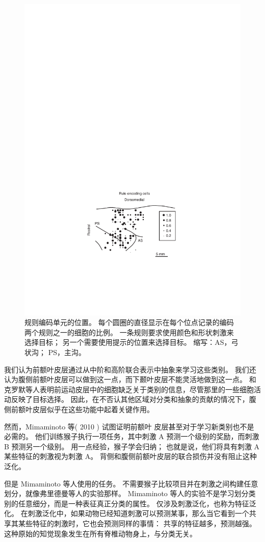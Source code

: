 \begin{figure}
	\centering
	\includegraphics[width=0.6\linewidth]{chap7/7_8}
	\caption{规则编码单元的位置。 
		每个圆圈的直径显示在每个位点记录的编码两个规则之一的细胞的比例。
		一条规则要求使用颜色和形状刺激来选择目标； 另一个需要使用提示的位置来选择目标。 
		缩写：AS，弓状沟； PS，主沟\cite{white1999rule}。\label{fig:7_8}}
\end{figure}
\par


我们认为前额叶皮层通过从中阶和高阶联合表示中抽象来学习这些类别。 
我们还认为腹侧前额叶皮层可以做到这一点，而下颞叶皮层不能灵活地做到这一点。 
和克罗默等人\cite{cromer2011comparison}表明前运动皮层中的细胞缺乏关于类别的信息，尽管那里的一些细胞活动反映了目标选择。 
因此，在不否认其他区域对分类和抽象的贡献的情况下，腹侧前额叶皮层似乎在这些功能中起着关键作用。
\par


然而，Mimaminoto 等( 2010 ) 试图证明前额叶 皮层甚至对于学习新类别也不是必需的。 
他们训练猴子执行一项任务，其中刺激 A 预测一个级别的奖励，而刺激 B 预测另一个级别。 
用一点经验，猴子学会归纳； 也就是说，他们将具有刺激 A 某些特征的刺激视为刺激 A。
背侧和腹侧前额叶皮层的联合损伤并没有阻止这种泛化。
\par


但是 Mimaminoto 等人使用的任务。 
不需要猴子比较项目并在刺激之间构建任意划分，就像弗里德曼等人的实验那样。
Mimaminoto 等人的实验不是学习划分类别的任意细分，而是一种表征真正分类的属性。 
仅涉及刺激泛化，也称为特征泛化\cite{buckley2010top}。 
在刺激泛化中，如果动物已经知道刺激可以预测某事，那么当它看到一个共享其某些特征的刺激时，它也会预测同样的事情：
共享的特征越多，预测越强。
这种原始的知觉现象发生在所有脊椎动物身上，与分类无关。
\par


